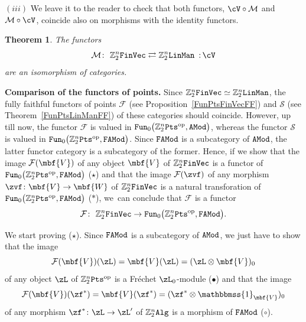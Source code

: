 \documentclass[10pt,a4paper]{amsart}
\newcommand{\Id}{\mathbbmss{1}}
\newcommand{\op}[1]{\operatorname{#1}}
\newcommand{\Z}{{\mathbb Z}}
\def\cM{\cal M}
\def\cF{\mathcal{F}}
\def\cM{\mathcal{M}}
\newcommand{\0}{\otimes}
\newcommand{\z}{\Z_2^n}
\numberwithin{equation}{section}
\newtheorem{Theorem}{Theorem}[section]
\providecommand{\cal}{\mathcal}
\begin{document}
$(iii)$ We leave it to the reader to check that both functors, $\cV\circ\cM$ and $\cM\circ\cV$, coincide also on morphisms with the identity functors.

\begin{Theorem}
The functors
\[
\cM\colon\ \z{\tt FinVec}\rightleftarrows\z{\tt LinMan}\ \,{:}\, \cV
\]
are an isomorphism of categories.
\end{Theorem}

\noindent
{\bf Comparison of the functors of points.} Since $\z{\tt FinVec}\simeq\z{\tt LinMan}$, the fully faithful functors of points $\cF$ (see Proposition~\ref{FunPtsFinVecFF}) and $\mathcal{S}$ (see Theorem~\ref{FunPtsLinManFF}) of these categories should coincide. However, up till now, the functor $\cF$ is valued in ${\tt Fun}_0\big(\z{\tt Pts}^{\op{op}},{\tt AMod}\big)$, whereas the functor $\mathcal{S}$ is valued in ${\tt Fun}_0\big(\z{\tt Pts}^{\op{op}},{\tt FAMod}\big)$. Since $\tt FAMod$ is a subcategory of $\tt AMod$, the latter functor category is a subcategory of the former. Hence, if we show that the image $\cF(\mbf{V})$ of any object $\mbf{V}$ of $\z{\tt FinVec}$ is a functor of ${\tt Fun}_0\big(\z{\tt Pts}^{\op{op}},{\tt FAMod}\big)$ ($\star$) and that the image $\cF(\zvf)$ of any morphism $\zvf\colon \mbf{V}\to \mbf{W}$ of $\z{\tt FinVec}$ is a natural transforation of ${\tt Fun}_0\big(\z{\tt Pts}^{\op{op}},{\tt FAMod}\big)$ ($\ast$), we~can conclude that $\cF$ is a functor
\[
\cF\colon\ \z{\tt FinVec}\to{\tt Fun}_0\big(\z{\tt Pts}^{\op{op}},{\tt FAMod}\big).
\]

We start proving ($\star$). Since $\tt FAMod$ is a subcategory of $\tt AMod$, we just have to show that the image
\[
\cF(\mbf{V})(\zL)=\mbf{V}(\zL)=(\zL\0\mbf{V})_0
\]
of any object $\zL$ of $\z{\tt Pts}^{\op{op}}$ is a Fr\'echet $\zL_0$-module ($\bullet$) and that the image
\[
\cF(\mbf{V})(\zf^*)=\mbf{V}(\zf^*)=(\zf^*\0\Id_{\mbf{V}})_0
\]
of any morphism $\zf^*\colon \zL\to\zL'$ of $\z\tt Alg$ is a morphism of $\tt FAMod$ ($\circ$).

\newcommand{\rma}{\textrm{a}}
\newcommand{\rmv}{\textrm{v}}
\end{document}
